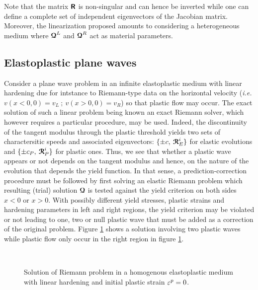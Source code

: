 \begin{remark}
  Note that the matrix $\boldsymbol{\mathsf{R}}$ is non-singular and can hence be inverted while one can define a complete set of independent eigenvectors of the Jacobian matrix. Moreover, the linearization proposed amounts to considering a heterogeneous medium where ${\boldsymbol{\mathcal{Q}}}^{L}$ and ${\boldsymbol{\mathcal{Q}}}^R$ act as material parameters.
\end{remark}

\subsection{Elastoplastic plane waves}
Consider a plane wave problem in an infinite elastoplastic medium with linear hardening due for intstance to Riemann-type data on the horizontal velocity (\textit{i.e. }$v(x<0,0)=v_L\:;\:v(x>0,0)=v_R$) so that plastic flow may occur.
The exact solution of such a linear problem being known \cite{Wang} an exact Riemann solver, which however requires a particular procedure, may be used. Indeed, the discontinuity of the tangent modulus through the plastic threshold yields two sets of charactersitic speeds and associated eigenvectors: $\{\pm c , \: {\boldsymbol{\mathcal{R}}}^i_E\}$ for elastic evolutions and $\{\pm c_P, \: {\boldsymbol{\mathcal{R}}}^i_P\}$ for plastic ones.  Thus, we see that whether a plastic wave appears or not depends on the tangent modulus and hence, on the nature of the evolution that depends the yield function. In that sense, a prediction-correction procedure must be followed by first solving an elastic Riemann problem which resulting (trial) solution ${\boldsymbol{\mathcal{Q}}}$ is tested against the yield criterion on both sides $x<0$ or $x>0$. With possibly different yield stresses, plastic strains and hardening parameters in left and right regions,
the yield criterion may be violated or not leading to one, two or null plastic wave that must be added as a correction of the original problem. Figure \ref{fig:EP_bar_solution} shows a solution involving two plastic waves while plastic flow only occur in the right region in figure \ref{fig:EP_bar_solution}.
\begin{figure}[h!]
  \centering
  \\
  \caption{Solution of Riemann problem in a homogenous elastoplastic medium with linear hardening and initial plastic strain $\varepsilon^p=0$.}
  \label{fig:EP_bar_solution}
\end{figure}
